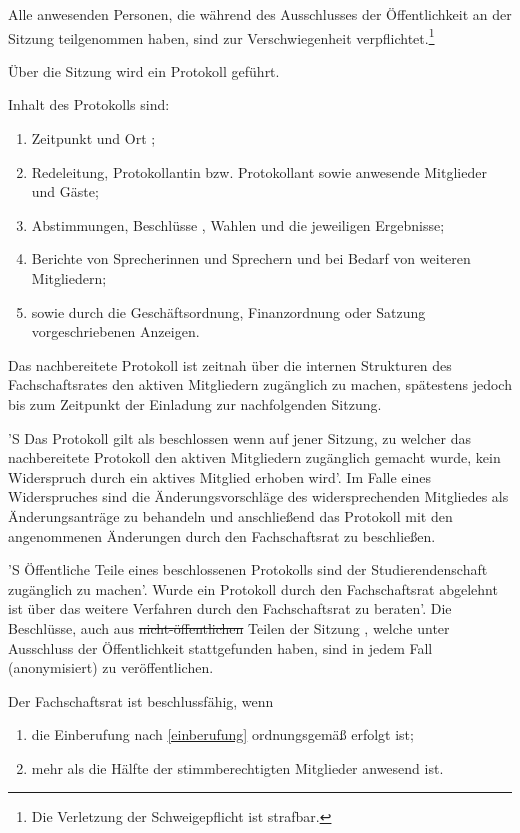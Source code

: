 \documentclass[%
	parskip=half,
]{scrartcl}
\newcommand{\edit}[1]{{\color{red} #1}}
\newcommand{\add}[1]{{\color{blue} #1}}
\newcommand{\new}[1]{{\color{orange} #1}}
\newcommand{\delete}[1]{{\color{red} \sout{#1}}}
\begin{document}
\begin{contract}
\edit{Alle anwesenden Personen, die während des Ausschlusses der Öffentlichkeit an der Sitzung teilgenommen haben, sind 
zur Verschwiegenheit verpflichtet.}\footnote{\add{Die Verletzung der Schweigepflicht ist strafbar.}}


Über die Sitzung wird ein Protokoll geführt.

Inhalt des Protokolls sind:
\begin{enumerate}[\qquad a)]
	\item \add{Zeitpunkt und} Ort\edit{;}
	\item \edit{Rede}leitung, \edit{Protokollantin bzw. Protokollant} sowie anwesende Mitglieder und Gäste;
	\item Abstimmungen, Beschlüsse\add{, Wahlen} und die jeweiligen Ergebnisse;
	\item Berichte von \edit{Sprecherinnen und Sprechern} \add{und bei Bedarf von weiteren Mitgliedern};
	\item sowie durch die Geschäftsordnung, Finanzordnung oder Satzung vorgeschriebenen Anzeigen.
\end{enumerate}

Das nachbereitete Protokoll ist zeitnah über die internen Strukturen des Fachschaftsrates den \new{aktiven} Mitgliedern
zugänglich zu machen, spätestens jedoch bis zum Zeitpunkt der Einladung zur nachfolgenden Sitzung.

'S Das Protokoll gilt als beschlossen wenn auf jener Sitzung, zu welcher das nachbereitete Protokoll den \new{aktiven}
Mitgliedern zugänglich gemacht wurde, kein Widerspruch durch ein \new{aktives} Mitglied erhoben wird'. Im Falle eines
Widerspruches sind die Änderungsvorschläge des widersprechenden Mitgliedes als Änderungsanträge zu behandeln und
anschließend das Protokoll mit den angenommenen Änderungen durch den Fachschaftsrat zu beschließen.

'S Öffentliche Teile eines beschlossenen Protokolls sind der Studierendenschaft zugänglich zu machen'. Wurde ein 
Protokoll durch den Fachschaftsrat abgelehnt ist über das weitere Verfahren durch den Fachschaftsrat zu beraten'. Die 
Beschlüsse, auch aus \delete{nicht-öffentlichen} Teilen der Sitzung\add{, welche unter Ausschluss der Öffentlichkeit 
stattgefunden haben}, sind in jedem Fall (anonymisiert) zu veröffentlichen.


Der Fachschaftsrat ist beschlussfähig, wenn
\begin{enumerate}[\qquad a)]
	\item die \edit{Einberufung} \add{nach \ref{einberufung}} ordnungsgemäß erfolgt ist;
	\item mehr als die Hälfte der stimmberechtigten Mitglieder anwesend ist.
\end{enumerate}


\end{contract}
\end{document}
